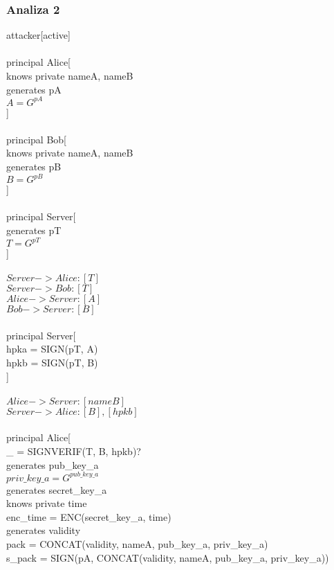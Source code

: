 \documentclass[11pt]{article}
\begin{document}
 \subsubsection{Analiza 2}
 attacker[active]\\\\
principal Alice[\\
	knows private nameA, nameB\\
	generates pA\\
	$A = G^{pA}$\\
]\\\\
principal Bob[\\
	knows private nameA, nameB\\
	generates pB\\
	$B = G^{pB}$\\
]\\\\
principal Server[\\
	generates pT\\
	$T = G^{pT}$\\
]\\\\
$Server -> Alice: [T]$\\
$Server -> Bob: [T]$\\
$Alice -> Server: [A]$\\
$Bob -> Server: [B]$\\\\
principal Server[\\
	hpka = SIGN(pT, A)\\
	hpkb = SIGN(pT, B)\\
]\\\\
$Alice -> Server: [nameB]$\\
$Server -> Alice: [B], [hpkb]$\\\\
principal Alice[\\
	\_ = SIGNVERIF(T, B, hpkb)?\\
	generates pub\_key\_a\\
	$priv\_key\_a = G^{pub\_key\_a}$\\
	generates secret\_key\_a\\
	knows private time\\
	enc\_time = ENC(secret\_key\_a, time)\\
	generates validity\\
	pack = CONCAT(validity, nameA, pub\_key\_a, priv\_key\_a)\\
	s\_pack = SIGN(pA, CONCAT(validity, nameA, pub\_key\_a, priv\_key\_a))\\
\end{document}
